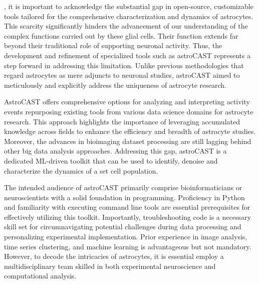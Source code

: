 , it is important to acknowledge the substantial gap in open-source, customizable tools tailored for the comprehensive characterization and dynamics of astrocytes. This scarcity significantly hinders the advancement of our understanding of the complex functions carried out by these glial cells. Their function extends far beyond their traditional role of supporting neuronal activity\citep{montalant_role_2021,ransom_new_2003}. Thus, the development and refinement of specialized tools such as astroCAST represents a step forward in addressing this limitation. Unlike previous methodologies that regard astrocytes as mere adjuncts to neuronal studies, astroCAST aimed to meticulously and explicitly address the uniqueness of astrocyte research.

AstroCAST offers comprehensive options for analyzing and interpreting activity events repurposing existing tools from various data science domains for astrocyte research. This approach highlights the importance of leveraging accumulated knowledge across fields to enhance the efficiency and breadth of astrocyte studies. Moreover, the advances in bioimaging dataset processing are still lagging behind other big data analysis approaches. Addressing this gap, astroCAST is a dedicated ML-driven toolkit that can be used to identify, denoise and characterize the dynamics of a set cell population.

The intended audience of astroCAST primarily comprise bioinformaticians or neuroscientists with a solid foundation in programming. Proficiency in Python and familiarity with executing command line tools are essential prerequisites for effectively utilizing this   toolkit. Importantly, troubleshooting code is a necessary skill set for circumnavigating potential challenges during data processing and personalizing experimental implementation. Prior experience in image analysis, time series clustering, and machine learning is advantageous but not mandatory. However, to decode the intricacies of astrocytes, it is essential employ a multidisciplinary team skilled in both experimental neuroscience and computational analysis.

